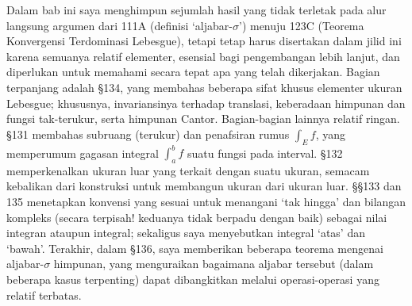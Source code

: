 
\def\chaptername{Pelengkap}
\def\sectionname{Pendahuluan}


Dalam bab ini saya menghimpun sejumlah hasil yang tidak terletak pada alur
langsung argumen dari 111A (definisi `aljabar-$\sigma$') menuju 123C
(Teorema Konvergensi Terdominasi Lebesgue), tetapi tetap harus disertakan
dalam jilid ini karena semuanya relatif elementer, esensial bagi pengembangan
lebih lanjut, dan diperlukan untuk memahami secara tepat apa yang telah
dikerjakan. Bagian terpanjang adalah \S134, yang membahas beberapa sifat
khusus elementer ukuran Lebesgue; khususnya, invariansinya terhadap translasi,
keberadaan himpunan dan fungsi tak-terukur, serta himpunan Cantor. Bagian-bagian
lainnya relatif ringan. \S131 membahas subruang (terukur) dan penafsiran
rumus $\int_Ef$, yang memperumum gagasan integral $\int_a^bf$ suatu fungsi
pada interval. \S132 memperkenalkan ukuran luar yang terkait dengan suatu
ukuran, semacam kebalikan dari konstruksi \Caratheodory{} untuk membangun ukuran
dari ukuran luar. \S\S133 dan 135 menetapkan konvensi yang sesuai untuk menangani
`tak hingga' dan bilangan kompleks (secara terpisah! keduanya tidak berpadu
dengan baik) sebagai nilai integran ataupun integral; sekaligus saya
menyebutkan integral `atas' dan `bawah'. Terakhir, dalam \S136, saya memberikan
beberapa teorema mengenai aljabar-$\sigma$ himpunan, yang menguraikan bagaimana
aljabar tersebut (dalam beberapa kasus terpenting) dapat dibangkitkan melalui
operasi-operasi yang relatif terbatas.

\discrpage
